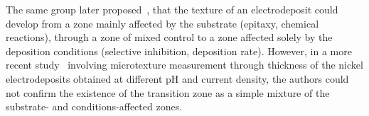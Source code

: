 The same group later proposed~\cite{Rasmussen2001}, that the texture of an electrodeposit could develop from a zone mainly affected by the substrate (epitaxy, chemical reactions), through a zone of mixed control to a zone affected solely by the deposition conditions (selective inhibition, deposition rate). However, in a more recent study~\cite{Alimadadi2016} involving microtexture measurement through thickness of the nickel electrodeposits obtained at different pH and current density, the authors could not confirm the existence of the transition zone as a simple mixture of the substrate- and conditions-affected zones. 

%

\cleardoublepage


